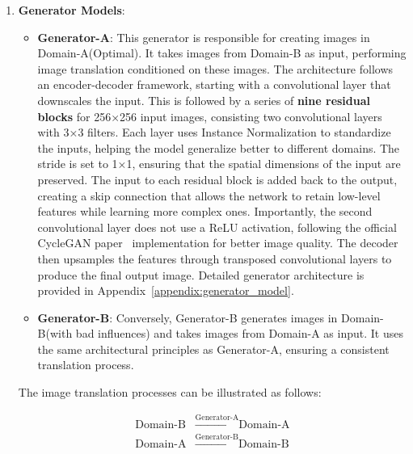 \documentclass[12pt,DIV14,BCOR12mm,a4paper,footinclude=false,headinclude,parskip=half-,twoside,openright,cleardoublepage=empty,toc=index,bibliography=totoc,listof=totoc]{scrreprt}
\numberwithin{equation}{chapter}
\begin{document}
\begin{enumerate}
    \item \textbf{Generator Models}:
    \begin{itemize}
        \item \textbf{Generator-A}: This generator is responsible for creating images in Domain-A(Optimal). It takes images from Domain-B as input, performing image translation conditioned on these images. The architecture follows an encoder-decoder framework, starting with a convolutional layer that downscales the input. This is followed by a series of \textbf{nine residual blocks} for 256×256 input images, consisting two convolutional layers with 3×3 filters. Each layer uses Instance Normalization to standardize the inputs, helping the model generalize better to different domains. The stride is set to 1×1, ensuring that the spatial dimensions of the input are preserved. The input to each residual block is added back to the output, creating a skip connection that allows the network to retain low-level features while learning more complex ones. Importantly, the second convolutional layer does not use a ReLU activation, following the official CycleGAN paper~\cite{zhu2017unpaired} implementation for better image quality. The decoder then upsamples the features through transposed convolutional layers to produce the final output image. Detailed generator architecture is provided in Appendix~\ref{appendix:generator_model}.
        \item \textbf{Generator-B}: Conversely, Generator-B generates images in Domain-B(with bad influences) and takes images from Domain-A as input. It uses the same architectural principles as Generator-A, ensuring a consistent translation process.
    \end{itemize}

    The image translation processes can be illustrated as follows:

    \begin{align*}
    \text{Domain-B} & \xrightarrow{\text{Generator-A}} \text{Domain-A} \\
    \text{Domain-A} & \xrightarrow{\text{Generator-B}} \text{Domain-B}
    \end{align*}


\end{enumerate}
\end{document}
